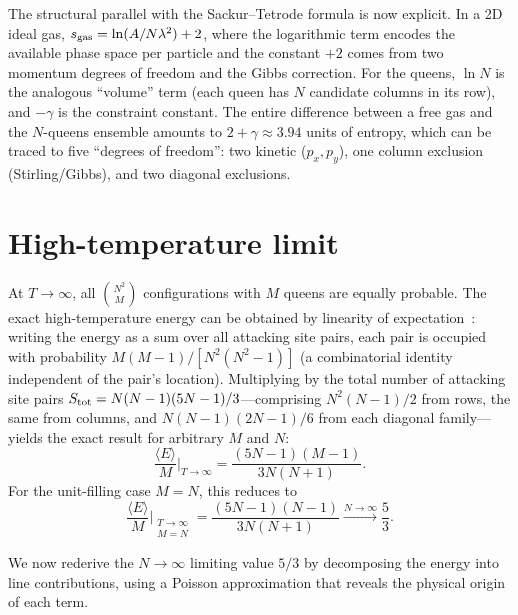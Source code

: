 \documentclass[aps, pre, reprint, amsmath, amssymb, superscriptaddress, floatfix]{revtex4-2}
\begin{document}
The structural parallel with the Sackur--Tetrode formula is now
explicit.  In a 2D ideal gas, $s_{\rm gas} = \ln(A/N\lambda^2) + 2$,
where the logarithmic term encodes the available phase space per
particle and the constant $+2$ comes from two momentum degrees of
freedom and the Gibbs correction.  For the queens, $\ln N$ is the
analogous ``volume'' term (each queen has $N$ candidate columns in its
row), and $-\gamma$ is the constraint constant.  The entire
difference between a free gas and the $N$-queens ensemble amounts to
$2 + \gamma \approx 3.94$ units of entropy, which can be traced to
five ``degrees of freedom'': two kinetic ($p_x, p_y$), one
column exclusion (Stirling/Gibbs), and two diagonal exclusions.


\section{High-temperature limit}
\label{sec:highT}

At $T \to \infty$, all $\binom{N^2}{M}$ configurations with $M$
queens are equally probable.  The exact high-temperature energy can be
obtained by linearity of expectation~\cite{Polson2024}: writing the
energy as a sum over all attacking site pairs, each pair is occupied
with probability $M(M-1)/[N^2(N^2-1)]$ (a combinatorial identity
independent of the pair's location).  Multiplying by the total number
of attacking site pairs $S_{\rm tot} = N(N-1)(5N-1)/3$---comprising
$N^2(N-1)/2$ from rows, the same from columns, and $N(N-1)(2N-1)/6$
from each diagonal family---yields the exact result for arbitrary $M$
and $N$:
\begin{equation}
  \frac{\langle E \rangle}{M}\bigg|_{T \to \infty}
  = \frac{(5N-1)(M-1)}{3N(N+1)}.
  \label{eq:E_highT_general}
\end{equation}
For the unit-filling case $M = N$, this reduces to
\begin{equation}
  \frac{\langle E \rangle}{M}\bigg|_{\substack{T \to \infty \\ M = N}}
  = \frac{(5N-1)(N-1)}{3N(N+1)}
  \xrightarrow{N \to \infty} \frac{5}{3}.
  \label{eq:E_highT}
\end{equation}

We now rederive the $N \to \infty$ limiting value $5/3$ by
decomposing the energy into line contributions, using a Poisson
approximation that reveals the physical origin of each term.
\end{document}
